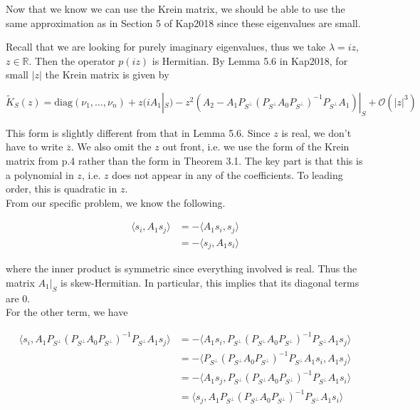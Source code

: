 \documentclass[12pt]{article}
\def\R{{\mathbb R}}
\begin{document}
Now that we know we can use the Krein matrix, we should be able to use the same approximation as in Section 5 of Kap2018 since these eigenvalues are small.

Recall that we  are looking for purely imaginary eigenvalues, thus we take $\lambda = i z$, $z \in \R$. Then the operator $p(iz)$ is Hermitian. By Lemma 5.6 in Kap2018, for small $|z|$ the Krein matrix is given by

\begin{equation}
\tilde{K}_S(z) = \text{diag}(\nu_1, \dots, \nu_n) + z(i A_1|_S) - z^2\left( A_2 - A_1 P_{S^\perp} (P_{S^\perp} A_0 P_{S^\perp})^{-1} P_{S^\perp} A_1 \right)|_S + \mathcal{O}(|z|^3)
\end{equation}

This form is slightly different from that in Lemma 5.6. Since $z$ is real, we don't have to write $\overline{z}$. We also omit the $z$ out front, i.e. we use the form of the Krein matrix from p.4 rather than the form in Theorem 3.1. The key part is that this is a polynomial in $z$, i.e. $z$ does not appear in any of the coefficients. To leading order, this is quadratic in $z$.\\

From our specific problem, we know the following.

\begin{align*}
\langle s_i, A_1 s_j \rangle &= -\langle A_1 s_i, s_j \rangle \\
&= -\langle s_j, A_1 s_i \rangle
\end{align*}

where the inner product is symmetric since everything involved is real. Thus the matrix $A_1|_S$ is skew-Hermitian. In particular, this implies that its diagonal terms are 0.\\

For the other term, we have

\begin{align*}
\langle s_i, A_1 P_{S^\perp} (P_{S^\perp} A_0 P_{S^\perp})^{-1} P_{S^\perp} A_1 s_j \rangle &= -\langle A_1 s_i, P_{S^\perp} (P_{S^\perp} A_0 P_{S^\perp})^{-1} P_{S^\perp} A_1 s_j \rangle \\
&= -\langle P_{S^\perp} (P_{S^\perp} A_0 P_{S^\perp})^{-1} P_{S^\perp} A_1 s_i, A_1 s_j \rangle \\
&= -\langle A_1 s_j, P_{S^\perp} (P_{S^\perp} A_0 P_{S^\perp})^{-1} P_{S^\perp} A_1 s_i \rangle \\
&= \langle s_j, A_1 P_{S^\perp} (P_{S^\perp} A_0 P_{S^\perp})^{-1} P_{S^\perp} A_1 s_i \rangle
\end{align*}
\end{document}
